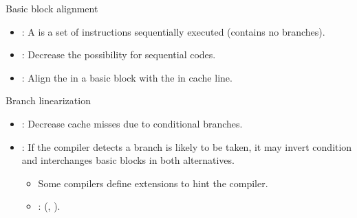 \begin{frame}[t]{Basic block alignment}
\begin{itemize}
  \item {}: 
        A  is a set of instructions
        sequentially executed (contains no branches).

  \item {}: Decrease  the
         possibility for sequential codes.

  \item {}: 
        Align the  in a basic block
        with the  in cache line.
\end{itemize}
\end{frame}

\begin{frame}[t]{Branch linearization}
\begin{itemize}
  \item {}: 
        Decrease cache misses due to conditional branches.

  \item {}: If the compiler detects a branch is likely
        to be taken, it may invert condition and interchanges basic blocks
        in both alternatives.
    \begin{itemize}
      \item Some compilers define extensions to hint the compiler.
      \item {}:  (\cppkey{[[likely]]}, \cppkey{[[unlikely]]}).
    \end{itemize}

\end{itemize}
\end{frame}

